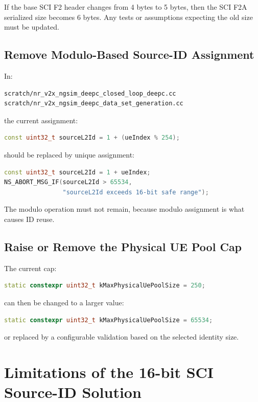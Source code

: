 \documentclass[11pt]{article}
\begin{document}
If the base SCI F2 header changes from 4 bytes to 5 bytes, then the SCI F2A serialized size becomes 6 bytes. Any tests or assumptions expecting the old size must be updated.

\subsection{Remove Modulo-Based Source-ID Assignment}

In:

\begin{lstlisting}
scratch/nr_v2x_ngsim_deepc_closed_loop_deepc.cc
scratch/nr_v2x_ngsim_deepc_data_set_generation.cc
\end{lstlisting}

the current assignment:

\begin{lstlisting}[language=C++]
const uint32_t sourceL2Id = 1 + (ueIndex % 254);
\end{lstlisting}

should be replaced by unique assignment:

\begin{lstlisting}[language=C++]
const uint32_t sourceL2Id = 1 + ueIndex;
NS_ABORT_MSG_IF(sourceL2Id > 65534,
                "sourceL2Id exceeds 16-bit safe range");
\end{lstlisting}

The modulo operation must not remain, because modulo assignment is what causes ID reuse.

\subsection{Raise or Remove the Physical UE Pool Cap}

The current cap:

\begin{lstlisting}[language=C++]
static constexpr uint32_t kMaxPhysicalUePoolSize = 250;
\end{lstlisting}

can then be changed to a larger value:

\begin{lstlisting}[language=C++]
static constexpr uint32_t kMaxPhysicalUePoolSize = 65534;
\end{lstlisting}

or replaced by a configurable validation based on the selected identity size.

\section{Limitations of the 16-bit SCI Source-ID Solution}
\end{document}
